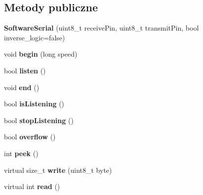 \subsection*{Metody publiczne}
\begin{DoxyCompactItemize}
\item 
\mbox{\label{class_software_serial_aab36336db4a1ca5073071c07d910cb87}} 
{\bfseries Software\+Serial} (uint8\+\_\+t receive\+Pin, uint8\+\_\+t transmit\+Pin, bool inverse\+\_\+logic=false)
\item 
\mbox{\label{class_software_serial_af1b194359d70894b3a2f38236a68480e}} 
void {\bfseries begin} (long speed)
\item 
\mbox{\label{class_software_serial_ad235539ef28939836bd0bde9387eb8fc}} 
bool {\bfseries listen} ()
\item 
\mbox{\label{class_software_serial_a9034270f7de617b3cc7d3f38f3a8e0df}} 
void {\bfseries end} ()
\item 
\mbox{\label{class_software_serial_a7b3fb4a8f57d2b5f2233f841d71ef80f}} 
bool {\bfseries is\+Listening} ()
\item 
\mbox{\label{class_software_serial_a1c87a6b43c176c104f28e2c2eec2841e}} 
bool {\bfseries stop\+Listening} ()
\item 
\mbox{\label{class_software_serial_ac6d4d5dfbe05515bf23766e2c8abfd46}} 
bool {\bfseries overflow} ()
\item 
\mbox{\label{class_software_serial_a51c2d2e79f0d982b1ef9cc9ac4453648}} 
int {\bfseries peek} ()
\item 
\mbox{\label{class_software_serial_ac24e5c6af203ec636c0a200b0cb3caf0}} 
virtual size\+\_\+t {\bfseries write} (uint8\+\_\+t byte)
\item 
\mbox{\label{class_software_serial_a2d0b2f2868d519c716114777f482705b}} 
virtual int {\bfseries read} ()
\item 

\end{DoxyCompactItemize}

